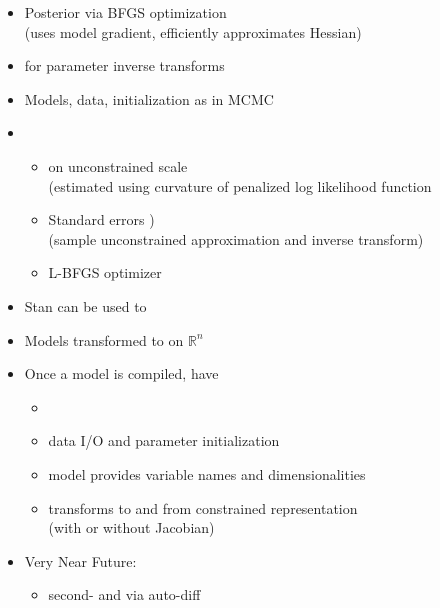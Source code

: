 \documentclass[10pt]{report}
\newcommand{\sld}[1]{\newpage{\noindent\LARGE \ \ \
    \textcolor{MidnightBlue}{\bfseries #1}}\vspace*{4pt}}
\newcommand{\myemph}[1]{{\color{MidnightBlue}{\bfseries #1}}}
\begin{document}
\sld{Penalized MLE}

\begin{itemize}
\item Posterior \myemph{mode finding} via BFGS optimization
  \\ {\footnotesize (uses model gradient, efficiently approximates Hessian)}
\item \myemph{Disables Jacobians} for parameter inverse transforms
\item Models, data, initialization as in MCMC
  \vfill
\item \myemph{Very Near Future}
  \vspace*{-4pt}
  \begin{itemize}\small
  \item  \myemph{Standard errors} on unconstrained scale
    \\
    {\footnotesize  (estimated using curvature of penalized log likelihood function}
  \item Standard errors \myemph{on constrained scale})
    \\
    {\footnotesize  (sample unconstrained approximation and inverse transform)}
  \item L-BFGS optimizer
  \end{itemize}      
\end{itemize}

\sld{Stan as a Research Tool}

\begin{itemize}
\item Stan can be used to \myemph{explore algorithms}
\item Models transformed to \myemph{unconstrained support} on $\mathbb{R}^n$
\item Once a model is compiled, have
  \vspace*{-4pt}
  \begin{itemize}\small
  \item \myemph{log probability, gradient, and Hessian}
  \item data I/O and parameter initialization
  \item model provides variable names and dimensionalities
  \item transforms to and from constrained representation 
    \\ {\footnotesize (with or without Jacobian)}
  \end{itemize}
\item {Very Near Future:}
  \vspace*{-4pt}
  \begin{itemize}\small
  \item second- and \myemph{higher-order derivatives} via auto-diff
  \end{itemize}
\end{itemize}
\end{document}
